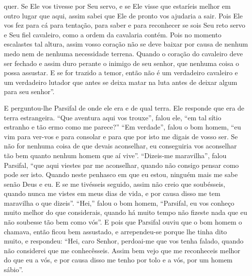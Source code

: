 quer. Se Ele vos tivesse por Seu servo, e se Ele visse que estaríeis melhor em
outro lugar que aqui, assim sabei que Ele de pronto vos ajudaria a sair. Pois
Ele vos fez para cá para tentação, para saber e para reconhecer se sois Seu
reto servo e Seu fiel cavaleiro, como a ordem da cavalaria contém. Pois no
momento escalastes tal altura, assim vosso coração não se deve baixar por causa
de nenhum medo nem de nenhuma necessidade terrena. Quando o coração do
cavaleiro deve ser fechado e assim duro perante o inimigo de seu senhor, que
nenhuma coisa o possa assustar. E se for trazido a temor, então não é um
verdadeiro cavaleiro e um verdadeiro lutador que antes se deixa matar na luta
antes de deixar algum para seu senhor”.  

E perguntou-lhe Parsifal de onde ele era e de qual terra. Ele responde que
era de terra estrangeira. “Que aventura aqui vos trouxe”, falou ele, “em tal
sítio estranho e tão ermo como me parece?” “Em verdade”, falou o bom homem,
“eu vim para ver-vos e para consolar e para que por isto me digais de vosso
ser. Se não for nenhuma coisa de que devais aconselhar, eu conseguiria vos
aconselhar tão bem quanto nenhum homem que aí vive”. “Dizeis-me maravilha”,
falou Parsifal, “que aqui viestes par me aconselhar, quando não consigo pensar
como pode ser isto. Quando neste penhasco em que eu estou,
ninguém mais me sabe senão Deus e eu. E se me tivésseis seguido, assim não
creio que soubésseis, quando nunca me vistes em meus dias de vida, e por causa
disso me tem maravilha o que dizeis”. “Hei,” falou o bom homem, “Parsifal, eu
vos conheço muito melhor do que considerais, quando há muito tempo não fizeste
nada que eu não soubesse tão bem como vós”. E pois que Parsifal ouviu que o
bom homem o chamava, então ficou bem assustado, e arrependeu-se porque lhe
tinha dito muito, e respondeu: “Hei, caro Senhor, perdoai-me que vos tenha
falado, quando não considerei que me conhecêsseis. Assim bem vejo que me
reconheceis melhor do que eu a vós, e por causa disso me tenho por tolo e a
vós, por um homem sábio”.

